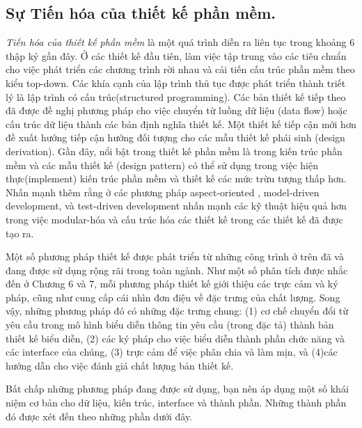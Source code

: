 \documentclass[./../SoftwareEngineering.tex]{subfiles}
\begin{document}
	\subsection{Sự Tiến hóa của thiết kế phần mềm.}
	\textit{Tiến hóa của thiết kế phần mềm} là một quá trình diễn ra liên tục trong khoảng 6 thập kỷ gần đây. Ở các thiết kế đầu tiên, làm việc tập trung vào các tiêu chuẩn cho việc phát triển các chương trình rời nhau và cải tiến cấu trúc phần mềm theo kiểu top-down. Các khía cạnh của lập trình thủ tục được phát triển thành triết lý là lập trình có cấu trúc(structured programming). Các bản thiết kế tiếp theo đã được đề nghị phương pháp cho việc chuyển từ luồng dữ liệu (data flow) hoặc cấu trúc dữ liệu thành các bản định nghĩa thiết kế. Một thiết kế tiếp cận mới hơn đề xuất hướng tiếp cận hướng đối tượng cho các mẫu thiết kế phái sinh (design derivation). Gần đây, nổi bật trong thiết kế phần mềm là trong kiến trúc phần mềm \cites{Kru06} và các mẫu thiết kế (design pattern) có thể sử dụng trong việc hiện thực(implement) kiến trúc phần mềm và thiết kế các mức trừu tượng thấp hơn. Nhấn mạnh thêm rằng ở các phương pháp aspect-oriented , model-driven development, và test-driven development nhấn mạnh các kỹ thuật hiệu quả hơn trong việc modular-hóa và cấu trúc hóa các thiết kế trong các thiết kế đã được tạo ra. 
	
	
	Một số phương pháp thiết kế được phát triển từ những công trình ở trên đã và đang được sử dụng rộng rãi trong toàn ngành. Như một số phân tích được nhắc đến ở Chương 6 và 7, mỗi phương pháp thiết kế giới thiệu các trực cảm và ký pháp, cũng như cung cấp cái nhìn đơn điệu về đặc trưng của chất lượng. Song vậy, những phương pháp đó có những đặc trưng chung: (1) cơ chế chuyển đổi từ yêu cầu trong mô hình biểu diễn thông tin yêu cầu (trong đặc tả) thành bản thiết kế biểu diễn, (2) các ký pháp cho việc biểu diễn thành phần chức năng và các interface của chúng, (3) trực cảm để việc phân chia và làm mịn, và (4)các hướng dẫn cho việc đánh giá chất lượng bản thiết kế.
	
	Bất chấp những phương pháp đang được sử dụng, bạn nên áp dụng một số khái niệm cơ bản cho dữ liệu, kiến trúc, interface và thành phần. Những thành phần đó được xét đến theo những phần dưới đây.
	
\end{document}
